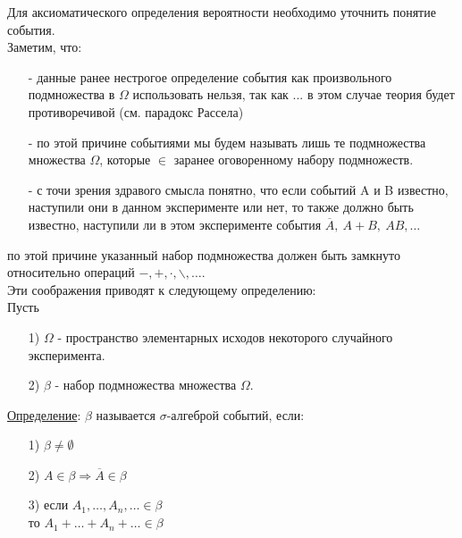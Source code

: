 
Для аксиоматического определения вероятности необходимо уточнить понятие события. \\
Заметим, что: \\
\begin{enumerate}
	\item[-]
	данные ранее нестрогое определение события как произвольного подмножества в $\Omega$ использовать нельзя, так как ... в этом случае теория будет противоречивой (см. парадокс Рассела)
	
	\item[-]
	по этой причине событиями мы будем называть лишь те подмножества множества $\Omega$, которые $\in$ заранее оговоренному набору подмножеств.
	
	\item[-]
	с точи зрения здравого смысла понятно, что если событий A и B известно, наступили они в данном эксперименте или нет, то также должно быть известно, наступили ли в этом эксперименте события $\overline{A}, \ A+B, \ AB, \ldots$ \\
\end{enumerate}

по этой причине указанный набор подмножества должен быть замкнуто относительно операций $-, +, \cdot, \backslash, \ldots$. \\

Эти соображения приводят к следующему определению: \\
Пусть \\
\begin{enumerate}
	\item[1)] 
	$\Omega$ - пространство элементарных исходов некоторого случайного эксперимента.
	
	\item[2)]
	$\beta$ - набор подмножества множества $\Omega$.
\end{enumerate}

\underline{Определение}: $\beta$ называется $\sigma$-алгеброй событий, если:
\begin{enumerate}
	\item[1)]
	$\beta \neq \emptyset$
	
	\item[2)]
	$A \in \beta \Rightarrow \overline{A} \in \beta$
	
	\item[3)]
	если $A_1, \ldots, A_n, \ldots \in \beta$ \\
	то $A_1 + \ldots + A_n + \ldots \in \beta$ \\
\end{enumerate}

